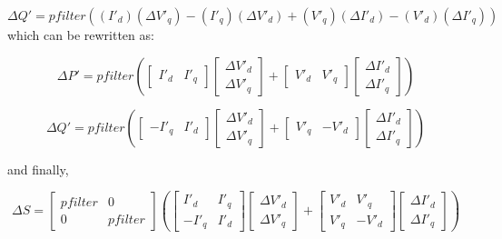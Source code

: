 \begin{equation}
 \Delta Q' =pfilter((I'_d)(\Delta V'_q)-(I'_q)(\Delta V'_d)+(V'_q)(\Delta I'_d)-(V'_d)(\Delta I'_q))
\end{equation}
which can be rewritten as:

\begin{equation}\label{power}
 \Delta P' =pfilter(\begin{bmatrix}I'_d & I'_q\end{bmatrix}\begin{bmatrix}\Delta V'_d\\\Delta V'_q\end{bmatrix}+\begin{bmatrix}V'_d & V'_q\end{bmatrix}\begin{bmatrix}\Delta I'_d\\\Delta I'_q\end{bmatrix})
\end{equation}

\begin{equation}
 \Delta Q'  =pfilter(\begin{bmatrix}-I'_q & I'_d\end{bmatrix}\begin{bmatrix}\Delta V'_d\\\Delta V'_q\end{bmatrix}+\begin{bmatrix}V'_q & -V'_d\end{bmatrix}\begin{bmatrix}\Delta I'_d\\\Delta I'_q\end{bmatrix})
\end{equation}

and finally,

\begin{equation}\label{power2}
 \Delta S =\begin{bmatrix}pfilter & 0\\0 &  pfilter\end{bmatrix}(\begin{bmatrix}I'_d & I'_q\\-I'_q & I'_d\end{bmatrix}\begin{bmatrix}\Delta V'_d\\\Delta V'_q\end{bmatrix}+\begin{bmatrix}V'_d & V'_q\\V'_q & -V'_d\end{bmatrix}\begin{bmatrix}\Delta I'_d\\\Delta I'_q\end{bmatrix})
\end{equation}

